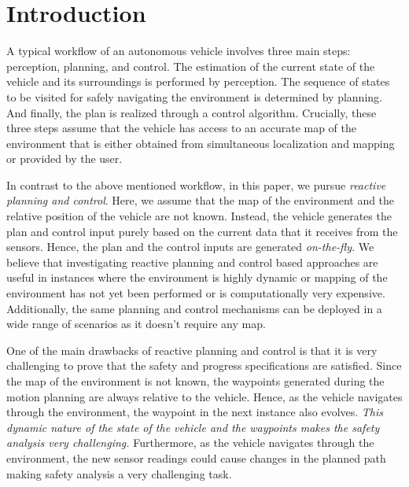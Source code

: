 \section{Introduction}
A typical workflow of an autonomous vehicle involves three main steps: perception, planning, and control.
% 
The estimation of the current state of the vehicle and its surroundings is performed by perception.
%
The sequence of states to be visited for safely navigating the environment is determined by planning.
%
And finally, the plan is realized through a control algorithm.
%
Crucially, these three steps assume that the vehicle has access to an accurate map of the environment that is either obtained from simultaneous localization and mapping or provided by the user.


In contrast to the above mentioned workflow, in this paper, we pursue \emph{reactive planning and control}.
%
Here, we assume that the map of the environment and the relative position of the vehicle are not known.
%
Instead, the vehicle generates the plan and control input purely based on the current data that it receives from the sensors.
%
Hence, the plan and the control inputs are generated \emph{on-the-fly}.
%
We believe that investigating reactive planning and control based approaches are useful in instances where the environment is highly dynamic or mapping of the environment has not yet been performed or is computationally very expensive.
%
Additionally, the same planning and control mechanisms can be deployed in a wide range of scenarios as it doesn't require any map.


One of the main drawbacks of reactive planning and control is that it is very challenging to prove that the safety and progress specifications are satisfied.
%
Since the map of the environment is not known, the waypoints generated during the motion planning are always relative to the vehicle.
%
Hence, as the vehicle navigates through the environment, the waypoint in the next instance also evolves.
%
\emph{This dynamic nature of the state of the vehicle and the waypoints makes the safety analysis very challenging.}
%
Furthermore, as the vehicle navigates through the environment, the new sensor readings could cause changes in the planned path making safety analysis a very challenging task.


